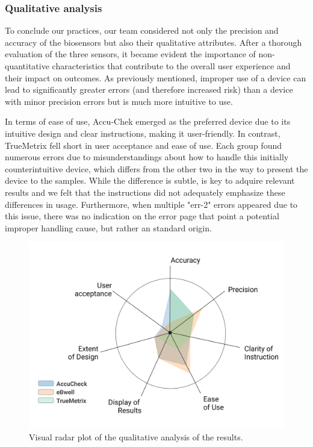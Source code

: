 \documentclass[conference]{IEEEtran}
\begin{document}
 \subsubsection{Qualitative analysis}

 To conclude our practices, our team considered not only the precision and 
 accuracy of the biosensors but also their qualitative attributes. After a 
 thorough evaluation of the three sensors, it became evident the importance of non-quantitative 
 characteristics that contribute to the overall user experience and their impact 
 on outcomes. As previously mentioned, improper use of a device can lead to 
 significantly greater errors (and therefore increased risk) than a device with 
 minor precision errors but is much more intuitive to use.
 
 In terms of ease of use, Accu-Chek emerged as the preferred device due to its 
 intuitive design and clear instructions, making it user-friendly. In contrast, 
 TrueMetrix fell short in user acceptance and ease of use. Each group found 
 numerous errors due to misunderstandings about how to handle this initially 
 counterintuitive device, which differs from the other two in the way to 
 present the device to the samples. While the difference is subtle, is key 
 to adquire relevant results and we felt that the instructions did not adequately emphasize these differences in usage. 
 Furthermore, when multiple "err-2" errors appeared due to this issue, there was no 
 indication on the error page that point a potential improper handling cause, but rather an standard origin.
 
 
    \begin{figure}[htbp]
      \centering
      \includegraphics[width=0.9\columnwidth]{images/qualitative.png}
      \caption{Visual radar plot of the qualitative analysis of the results.}
      \label{fig:qualitative}
   \end{figure}
\end{document}
